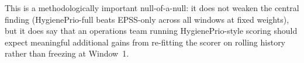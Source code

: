 

This is a methodologically important null-of-a-null: it does not weaken the central finding (HygienePrio-full beats EPSS-only across all windows at fixed weights), but it does say that an operations team running HygienePrio-style scoring should expect meaningful additional gains from re-fitting the scorer on rolling history rather than freezing at Window~1.
